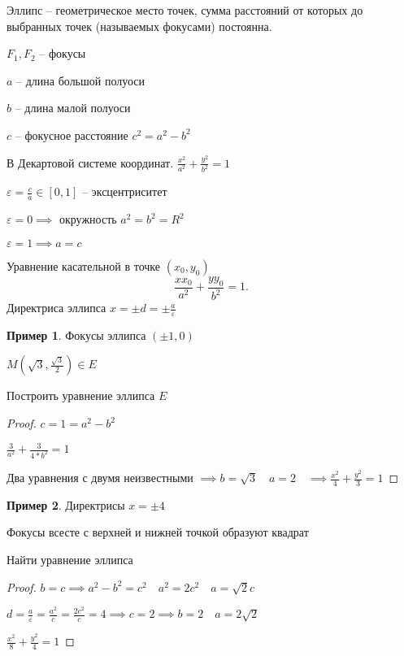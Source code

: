 \documentclass{book}
\theoremstyle{definition}
\newtheorem*{example}{Пример}
\newcommand{\incfig}[1]{%
    \def\svgwidth{\columnwidth}
    {#1.pdf_tex}
}
\begin{document}
\begin{definition}
    Эллипс -- геометрическое место точек, сумма расстояний от которых до выбранных точек (называемых фокусами) постоянна.


$F_1, F_2$ -- фокусы

$a$ -- длина большой полуоси

 $b$ -- длина малой полуоси

  $c$ -- фокусное расстояние  $c^2=a^2-b^2$

  В Декартовой системе координат. $\frac{x^2}{a^2} + \frac{y^2}{b^2} = 1$ 

  $\varepsilon = \frac{c}{a} \in [0,1]$ -- эксцентриситет

  $\varepsilon=0 \implies $ окружность $a^2=b^2=R^2$

  $\varepsilon=1 \implies  a=c$

  Уравнение касательной в точке $(x_0, y_0)$ \[
  \frac{x x_0}{a^2} + \frac{y y_0}{b^2} = 1
  .\] 
  Директриса эллипса $x = \pm d = \pm \frac{a}{\varepsilon}$
\end{definition}
\begin{example}
    Фокусы эллипса $(\pm 1, 0)$

    $M(\sqrt{3}, \frac{\sqrt{3} }{2}) \in E $ 

    Построить уравнение эллипса $E$
\end{example}
\begin{proof}
    $c = 1 = a^2-b^2$

     $\frac{3}{a^2} + \frac{3}{4 * b^2} = 1$

     Два уравнения с двумя неизвестными $\implies  b=\sqrt{3}\quad a=2\quad \implies \frac{x^2}{4} + \frac{y^2}{3} = 1 $
\end{proof}

\begin{example}
    Директрисы $x = \pm 4$

    Фокусы всесте с верхней и нижней точкой образуют квадрат

    Найти уравнение эллипса
\end{example}
\begin{proof}
    $b = c \implies a^2-b^2=c^2\quad a^2 = 2c^2\quad a = \sqrt{2}c $

    $d = \frac{a}{\varepsilon} = \frac{a^2}{c} = \frac{2c^2}{c} = 4 \implies c = 2\implies b = 2\quad a = 2\sqrt{2} $ 

    $\frac{x^2}{8} + \frac{y^2}{4} = 1$
\end{proof}
\end{document}
